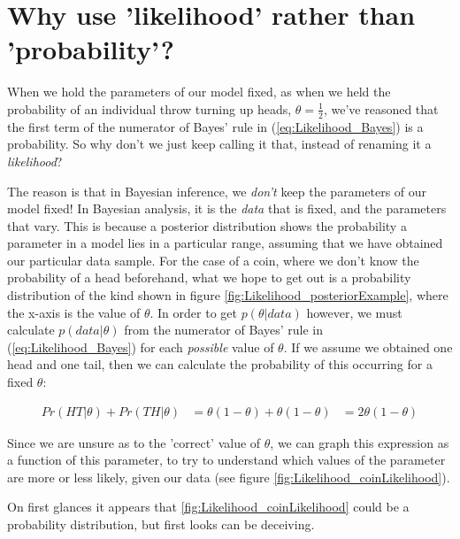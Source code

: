 \documentclass[11pt,fullpage]{book}
\begin{document}
\section{Why use 'likelihood' rather than 'probability'?}
When we hold the parameters of our model fixed, as when we held the probability of an individual throw turning up heads, $\theta=\frac{1}{2}$, we've reasoned that the first term of the numerator of Bayes' rule in (\ref{eq:Likelihood_Bayes}) is a probability. So why don't we just keep calling it that, instead of renaming it a \textit{likelihood}? 

The reason is that in Bayesian inference, we \textit{don't} keep the parameters of our model fixed! In Bayesian analysis, it is the \textit{data} that is fixed, and the parameters that vary. This is because a posterior distribution shows the probability a parameter in a model lies in a particular range, assuming that we have obtained our particular data sample. For the case of a coin, where we don't know the probability of a head beforehand, what we hope to get out is a probability distribution of the kind shown in figure \ref{fig:Likelihood_posteriorExample}, where the x-axis is the value of $\theta$. In order to get $p(\theta|data)$ however, we must calculate $p(data|\theta)$ from the numerator of Bayes' rule in (\ref{eq:Likelihood_Bayes}) for each \textit{possible} value of $\theta$. If we assume we obtained one head and one tail, then we can calculate the probability of this occurring for a fixed $\theta$:

\begin{align}
Pr(HT|\theta) + Pr(TH|\theta) &= \theta(1-\theta) + \theta(1-\theta)
&= 2\theta(1-\theta)
\end{align}

Since we are unsure as to the 'correct' value of $\theta$, we can graph this expression as a function of this parameter, to try to understand which values of the parameter are more or less likely, given our data (see figure \ref{fig:Likelihood_coinLikelihood}).

On first glances it appears that \ref{fig:Likelihood_coinLikelihood} could be a probability distribution, but first looks can be deceiving. 
\end{document}
